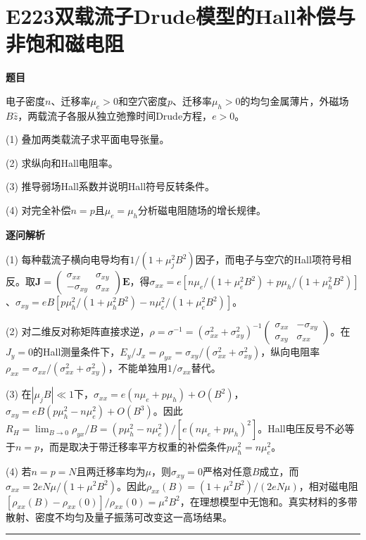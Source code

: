 \documentclass[UTF8,a4paper,11pt,oneside,openany]{ctexbook}
\begin{document}
\section*{E223\quad 双载流子Drude模型的Hall补偿与非饱和磁电阻}
\textbf{题目}\par
电子密度$n$、迁移率$\mu_e>0$和空穴密度$p$、迁移率$\mu_h>0$的均匀金属薄片，外磁场$B\hat z$，两载流子各服从独立弛豫时间Drude方程，$e>0$。
\par\smallskip\noindent (1) 叠加两类载流子求平面电导张量。
\par\smallskip\noindent (2) 求纵向和Hall电阻率。
\par\smallskip\noindent (3) 推导弱场Hall系数并说明Hall符号反转条件。
\par\smallskip\noindent (4) 对完全补偿$n=p$且$\mu_e=\mu_h$分析磁电阻随场的增长规律。
\par\medskip\textbf{逐问解析}\par
\par\smallskip\noindent (1) 每种载流子横向电导均有$1/(1+\mu_j^2B^2)$因子，而电子与空穴的Hall项符号相反。取$\mathbf J=\begin{pmatrix}\sigma_{xx}&\sigma_{xy}\\-\sigma_{xy}&\sigma_{xx}\end{pmatrix}\mathbf E$，得$\sigma_{xx}=e[n\mu_e/(1+\mu_e^2B^2)+p\mu_h/(1+\mu_h^2B^2)]$、$\sigma_{xy}=eB[p\mu_h^2/(1+\mu_h^2B^2)-n\mu_e^2/(1+\mu_e^2B^2)]$。
\par\smallskip\noindent (2) 对二维反对称矩阵直接求逆，$\rho=\sigma^{-1}=(\sigma_{xx}^2+\sigma_{xy}^2)^{-1}\begin{pmatrix}\sigma_{xx}&-\sigma_{xy}\\\sigma_{xy}&\sigma_{xx}\end{pmatrix}$。在$J_y=0$的Hall测量条件下，$E_y/J_x=\rho_{yx}=\sigma_{xy}/(\sigma_{xx}^2+\sigma_{xy}^2)$，纵向电阻率$\rho_{xx}=\sigma_{xx}/(\sigma_{xx}^2+\sigma_{xy}^2)$，不能单独用$1/\sigma_{xx}$替代。
\par\smallskip\noindent (3) 在$|\mu_jB|\ll1$下，$\sigma_{xx}=e(n\mu_e+p\mu_h)+O(B^2)$，$\sigma_{xy}=eB(p\mu_h^2-n\mu_e^2)+O(B^3)$。因此$R_H=\lim_{B\to0}\rho_{yx}/B=(p\mu_h^2-n\mu_e^2)/[e(n\mu_e+p\mu_h)^2]$。Hall电压反号不必等于$n=p$，而是取决于带迁移率平方权重的补偿条件$p\mu_h^2=n\mu_e^2$。
\par\smallskip\noindent (4) 若$n=p=N$且两迁移率均为$\mu$，则$\sigma_{xy}=0$严格对任意$B$成立，而$\sigma_{xx}=2eN\mu/(1+\mu^2B^2)$。因此$\rho_{xx}(B)=(1+\mu^2B^2)/(2eN\mu)$，相对磁电阻$[\rho_{xx}(B)-\rho_{xx}(0)]/\rho_{xx}(0)=\mu^2B^2$，在理想模型中无饱和。真实材料的多带散射、密度不均匀及量子振荡可改变这一高场结果。
\par\medskip\hrule\medskip
\end{document}

